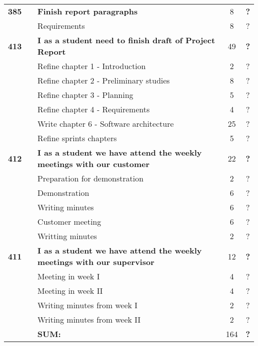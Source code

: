 \begin{longtable}{ccXcc}
\textbf{385} 	&
	& {\bf Finish report paragraphs} 	
	& 8	
	& \textbf{?} \\
		&& Requirements	& 8 & ? \\
\textbf{413} 	& 
	& {\bf I as a student need to finish draft of Project Report} 	
	& 49
	& \textbf{?} \\
	&& Refine chapter 1 - Introduction & 2 & ?\\
	&& Refine chapter 2 - Preliminary studies & 8 & ?\\
	&& Refine chapter 3 - Planning & 5 & ?\\
	&& Refine chapter 4 - Requirements & 4 & ?\\
	&& Write chapter 6 - Software architecture & 25 & ?\\
	&& Refine sprints chapters & 5 & ?\\
\textbf{412} 	& 
	& {\bf I as a student we have attend the weekly meetings with our customer} 	
	& 	22	
	& \textbf{?} \\
		&& Preparation for demonstration	& 2 & ? \\
		&& Demonstration	& 6 & ? \\
		&& Writing minutes 	&  6 & ? \\	
		&& Customer meeting	&  6 & ? \\
		&& Writting minutes	&  2 & ? \\
		
\textbf{411} 	& 
	& {\bf I as a student we have attend the weekly meetings with our supervisor} 	
	& 	12	
	& \textbf{?} \\
		&& Meeting in week I	& 4 & ? \\
		&& Meeting in week II	& 4 & ? \\
		&& Writing minutes from week I 	&  2 & ? \\
		&& Writing minutes from week II	&  2 & ? \\	
		
\midrule
		
				&& \textbf{SUM:}		&		164	& \textbf{?}
 \\																			
\bottomrule[1mm]
\end{longtable}
